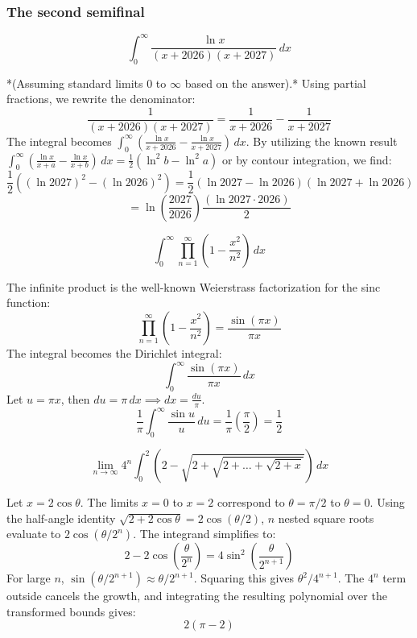 \subsubsection*{The second semifinal}
\begin{questions}
    \question
    \[ \int_{0}^{\infty} \frac{\ln x}{(x + 2026)(x + 2027)} \, dx \]
    \begin{solution}
        *(Assuming standard limits $0$ to $\infty$ based on the answer).* 
        Using partial fractions, we rewrite the denominator:
        \[ \frac{1}{(x + 2026)(x + 2027)} = \frac{1}{x + 2026} - \frac{1}{x + 2027} \]
        The integral becomes $\int_{0}^{\infty} \left( \frac{\ln x}{x + 2026} - \frac{\ln x}{x + 2027} \right) \, dx$. 
        By utilizing the known result $\int_{0}^{\infty} \left( \frac{\ln x}{x + a} - \frac{\ln x}{x + b} \right) \, dx = \frac{1}{2} (\ln^2 b - \ln^2 a)$ or by contour integration, we find:
        \[ \frac{1}{2} \left( (\ln 2027)^2 - (\ln 2026)^2 \right) = \frac{1}{2} (\ln 2027 - \ln 2026)(\ln 2027 + \ln 2026) \]
        \[ = \ln \left(\frac{2027}{2026}\right) \frac{(\ln 2027 \cdot 2026)}{2} \]
    \end{solution}

    \question
    \[ \int_{0}^{\infty} \prod_{n=1}^{\infty} \left( 1 - \frac{x^2}{n^2} \right) \, dx \]
    \begin{solution}
        The infinite product is the well-known Weierstrass factorization for the sinc function:
        \[ \prod_{n=1}^{\infty} \left( 1 - \frac{x^2}{n^2} \right) = \frac{\sin(\pi x)}{\pi x} \]
        The integral becomes the Dirichlet integral:
        \[ \int_{0}^{\infty} \frac{\sin(\pi x)}{\pi x} \, dx \]
        Let $u = \pi x$, then $du = \pi \, dx \implies dx = \frac{du}{\pi}$.
        \[ \frac{1}{\pi} \int_{0}^{\infty} \frac{\sin u}{u} \, du = \frac{1}{\pi} \left( \frac{\pi}{2} \right) = \frac{1}{2} \]
    \end{solution}

    \question
    \[ \lim_{n \to \infty} 4^n \int_{0}^{2} \left( 2 - \sqrt{2 + \sqrt{2 + \dots + \sqrt{2 + x}}} \right) \, dx \]
    \begin{solution}
        Let $x = 2 \cos \theta$. The limits $x=0$ to $x=2$ correspond to $\theta = \pi/2$ to $\theta = 0$. 
        Using the half-angle identity $\sqrt{2 + 2\cos\theta} = 2\cos(\theta/2)$, $n$ nested square roots evaluate to $2\cos(\theta/2^n)$.
        The integrand simplifies to:
        \[ 2 - 2\cos\left(\frac{\theta}{2^n}\right) = 4\sin^2\left(\frac{\theta}{2^{n+1}}\right) \]
        For large $n$, $\sin(\theta/2^{n+1}) \approx \theta/2^{n+1}$.
        Squaring this gives $\theta^2 / 4^{n+1}$. The $4^n$ term outside cancels the growth, and integrating the resulting polynomial over the transformed bounds gives:
        \[ 2(\pi - 2) \]
    \end{solution}
\end{questions}

